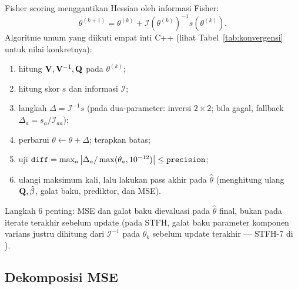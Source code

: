 Fisher scoring menggantikan Hessian oleh informasi Fisher:
\begin{equation}
  \theta^{(k+1)}=\theta^{(k)}+\mathcal I(\theta^{(k)})^{-1}
  s(\theta^{(k)}).
  \label{eq:fisher}
\end{equation}
Algoritme umum yang diikuti empat inti C++ (lihat
Tabel~\ref{tab:konvergensi} untuk nilai konkretnya):
\begin{enumerate}[label=\arabic*.]
  \item hitung $\mathbf{V},\mathbf{V}^{-1},\mathbf{Q}$ pada $\theta^{(k)}$;
  \item hitung skor $s$ dan informasi $\mathcal I$;
  \item langkah $\Delta=\mathcal I^{-1}s$ (pada dua-parameter: inversi
        $2\times2$; bila gagal, fallback $\Delta_a=s_a/\mathcal I_{aa}$);
  \item perbarui $\theta\leftarrow\theta+\Delta$; terapkan batas;
  \item uji $\texttt{diff}=\max_a\left|\Delta_a/\max(\theta_a,10^{-12})\right|\le
        \texttt{precision}$;
  \item ulangi maksimum  kali, lalu lakukan pass akhir pada
        $\hat\theta$ (menghitung ulang $\mathbf{Q},\hat\beta$, galat baku, prediktor,
        dan MSE).
\end{enumerate}
Langkah 6 penting: MSE dan galat baku dievaluasi pada $\hat\theta$ final,
bukan pada iterate terakhir sebelum update (pada STFH, galat baku parameter
komponen varians justru dihitung dari $\mathcal I^{-1}$ pada $\theta_k$
sebelum update terakhir --- STFH-7 di ).

\subsection{Dekomposisi MSE}\label{sec:mse}

